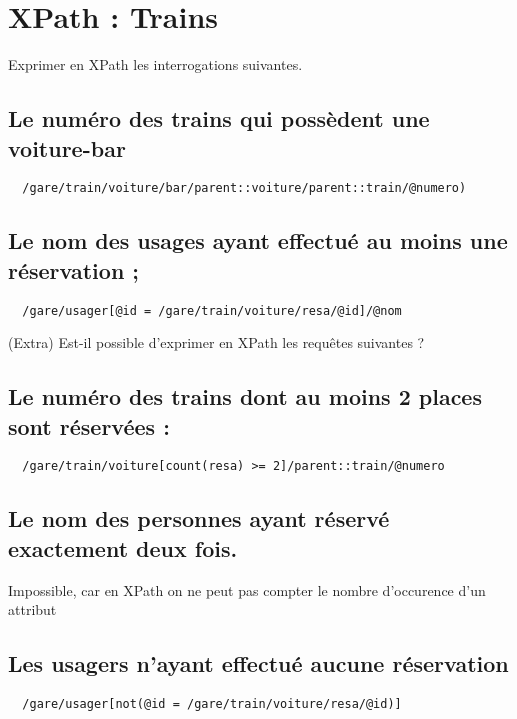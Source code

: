 \chapter{XPath : Trains}

Exprimer en XPath les interrogations suivantes.

\section{Le numéro des trains qui possèdent une voiture-bar}
\begin{verbatim}
  /gare/train/voiture/bar/parent::voiture/parent::train/@numero)
\end{verbatim}

\section{Le nom des usages ayant effectué au moins une réservation ;}
\begin{verbatim}
  /gare/usager[@id = /gare/train/voiture/resa/@id]/@nom
\end{verbatim}

(Extra) Est-il possible d’exprimer en XPath les requêtes suivantes ?

\section{Le numéro des trains dont au moins 2 places sont réservées :}
\begin{verbatim}
  /gare/train/voiture[count(resa) >= 2]/parent::train/@numero
\end{verbatim}


\section{Le nom des personnes ayant réservé exactement deux fois.}
Impossible, car en XPath on ne peut pas compter le nombre d'occurence d'un attribut

\section{Les usagers n’ayant effectué aucune réservation}
\begin{verbatim}
  /gare/usager[not(@id = /gare/train/voiture/resa/@id)]
\end{verbatim}

